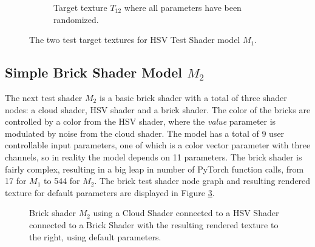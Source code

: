 \begin{figure}[!h]
\begin{subfigure}{.25\textwidth}
    \caption{Target texture $T_ {12}$ where all parameters have been randomized.}
    \label{fig:TargetsHSVShaderModelRandom}
\end{subfigure}
\caption{The two test target textures for HSV Test Shader model $M_1$.}
\label{fig:TargetsHSVShaderModel}
\end{figure}

\subsection{Simple Brick Shader Model $M_2$}
The next test shader $M_2$ is a basic brick shader with a total of three shader nodes: a cloud shader, HSV shader and a brick shader. The color of the bricks are controlled by a color from the HSV shader, where the \textit{value} parameter is modulated by noise from the cloud shader. The model has a total of 9 user controllable input parameters, one of which is a color vector parameter with three channels, so in reality the model depends on 11 parameters. The brick shader is fairly complex, resulting in a big leap in number of PyTorch function calls, from 17 for $M_1$ to 544 for $M_2$. The brick test shader node graph and resulting rendered texture for default parameters are displayed in Figure \ref{fig:M2NodeGraphAndDefaultRender}.

\begin{figure}[!h]
    \centering
    \caption{Brick shader $M_2$ using a Cloud Shader connected to a HSV Shader connected to a Brick Shader with the resulting rendered texture to the right, using default parameters. }
    \label{fig:M2NodeGraphAndDefaultRender}
\end{figure}

